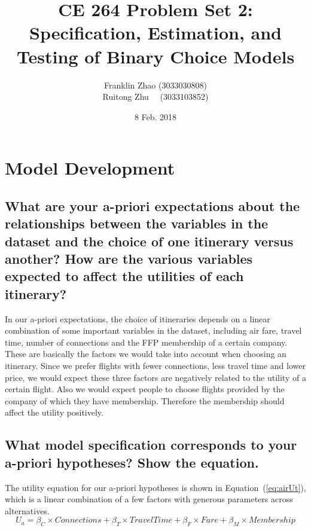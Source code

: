 \documentclass[11pt]{article}
\title{CE 264 Problem Set 2: Specification, Estimation, and Testing of Binary Choice Models}
\date{8 Feb. 2018}
\author{Franklin Zhao (3033030808)\\ Ruitong Zhu \ \  (3033103852)}
\begin{document}
	
	\maketitle
	\renewcommand\theequation{\arabic{equation}}
	\renewcommand{\figurename}{Fig.}
	\renewcommand\thesection{Part \arabic{section}}
	\renewcommand\thesubsection{\arabic{subsection}.}
	
\section{Model Development}
\subsection{\small{What are your a-priori expectations about the relationships between the variables in the dataset and the choice of one itinerary versus another? How are the various variables expected to affect the utilities of each itinerary?}}
In our a-priori expectations, the choice of itineraries depends on a linear combination of some important variables in the dataset, including air fare, travel time, number of connections and the FFP membership of a certain company. These are basically the factors we would take into account when choosing an itinerary. Since we prefer flights with fewer connections, less travel time and lower price, we would expect these three factors are negatively related to the utility of a certain flight. Also we would expect people to choose flights provided by the company of which they have membership. Therefore the membership should affect the utility positively.
\subsection{\small{What model specification corresponds to your a-priori hypotheses? Show the equation.}}
The utility equation for our a-priori hypotheses is shown in Equation~(\ref{eq:airUt}), which is a linear combination of a few factors with generous parameters across alternatives.
\begin{equation}\label{eq:airUt}
U_a=\beta_C\times Connections+\beta_T\times TravelTime+\beta_F\times Fare+\beta_M\times Membership
\end{equation}
\end{document}
